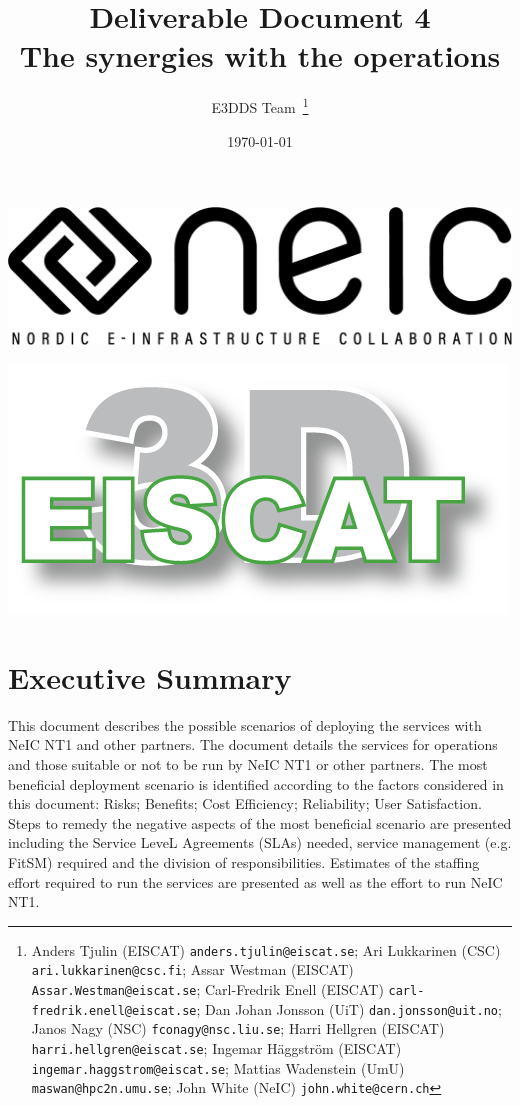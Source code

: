 \documentclass[12pt,a4paper]{article}
\title{
{\bf Deliverable Document 4} \\
The synergies with the \nnt operations}
\author{E3DDS Team~\footnote{
Anders Tjulin (EISCAT) {\tt anders.tjulin@eiscat.se};
Ari Lukkarinen (CSC) {\tt ari.lukkarinen@csc.fi};
Assar Westman (EISCAT) {\tt Assar.Westman@eiscat.se};
Carl-Fredrik Enell (EISCAT) {\tt carl-fredrik.enell@eiscat.se};
Dan Johan Jonsson (UiT) {\tt dan.jonsson@uit.no};
Janos Nagy (NSC) {\tt fconagy@nsc.liu.se};
Harri Hellgren (EISCAT) {\tt harri.hellgren@eiscat.se};
Ingemar H\"{a}ggstr\"{o}m (EISCAT) {\tt ingemar.haggstrom@eiscat.se};
Mattias Wadenstein (UmU) {\tt maswan@hpc2n.umu.se};
John White (NeIC) {\tt john.white@cern.ch}}}
\date{\today}
\newcommand{\nnt}{NeIC NT1\xspace}
\begin{document}
\pagestyle{fancy}

\maketitle
\par\noindent
\begin{minipage}{0.5\textwidth}
  \includegraphics[scale=0.18]{NEIC_logo_screen_black.pdf}
\end{minipage}
\begin{minipage}{0.5\textwidth}
  \hfill
  \includegraphics[width=0.75\linewidth]{e3d-logo-green-500px}
\end{minipage}

\newpage
\tableofcontents
\newpage

\section{Executive Summary}
\label{exec-summ}


This document describes the possible scenarios of deploying the \ED \einfra services with \nnt and other partners.
The document details the services for \ED operations and those suitable or not to be run by \nnt or other partners.
The most beneficial deployment scenario is identified according to the factors considered in this document: Risks; Benefits; Cost Efficiency; Reliability; User Satisfaction.
Steps to remedy the negative aspects of the most beneficial scenario are presented including the Service LeveL Agreements (SLAs) needed, service management (e.g. FitSM) required and the division of responsibilities.  
Estimates of the staffing effort required to run the \ED services are presented as well as the effort to run \nnt. 
\end{document}
